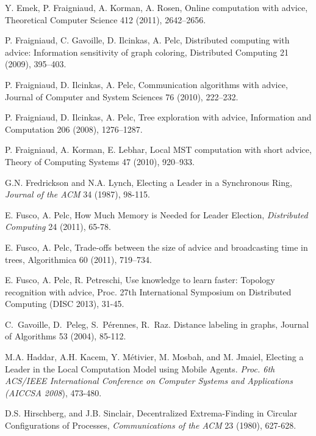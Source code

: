 \documentclass[11pt]{article}
\begin{document}
\begin{thebibliography}{12}
Y. Emek, P. Fraigniaud, A. Korman, A. Rosen, Online computation with advice, Theoretical Computer Science 412 (2011), 2642--2656.




P. Fraigniaud, C. Gavoille, D. Ilcinkas, A. Pelc, 
Distributed computing with advice: Information sensitivity of graph coloring, 
Distributed Computing 21 (2009), 395--403.

P. Fraigniaud, D. Ilcinkas, A. Pelc, 
Communication algorithms with advice, Journal of  Computer and System Sciences 76 (2010), 222--232.


P. Fraigniaud, D. Ilcinkas, A. Pelc, 
Tree exploration with advice, Information and Computation 206 (2008), 1276--1287.


P. Fraigniaud, A. Korman, E. Lebhar,
Local MST computation with short advice,
Theory of Computing Systems 47 (2010), 920--933.

G.N. Fredrickson and N.A. Lynch,
Electing a Leader in a Synchronous Ring,
{\em Journal of the ACM} 34 (1987), 98-115.

E. Fusco, A. Pelc, How Much Memory is Needed for Leader Election, {\em Distributed Computing} 24 (2011), 65-78. 








E. Fusco, A. Pelc, Trade-offs between the size of advice and broadcasting time in trees, Algorithmica 60 (2011), 719--734. 


E. Fusco, A. Pelc, R. Petreschi, Use knowledge to learn faster: Topology recognition with advice, Proc. 27th International Symposium on Distributed Computing (DISC 2013), 31-45.

C.~Gavoille, D.~Peleg, S.~P\'{e}rennes, R.~Raz.
Distance labeling in graphs, 
Journal of Algorithms 53 (2004), 85-112.

     M.A. Haddar, A.H. Kacem, Y. M\'{e}tivier, M. Mosbah, and M. Jmaiel,  Electing a Leader in the Local Computation Model using Mobile Agents.
{\em Proc.  6th ACS/IEEE International Conference on Computer Systems and Applications (AICCSA 2008}), 473-480.

D.S. Hirschberg, and J.B. Sinclair,
Decentralized Extrema-Finding in Circular Configurations of Processes,
{\em Communications of the ACM} 23 (1980), 627-628.






\end{thebibliography}
\end{document}
